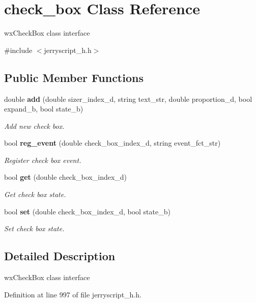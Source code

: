 \section{check\+\_\+box Class Reference}
\label{classcheck__box}


wx\+Check\+Box class interface  




{\ttfamily \#include $<$jerryscript\+\_\+h.\+h$>$}

\subsection*{Public Member Functions}
\begin{DoxyCompactItemize}
\item 
double \textbf{ add} (double sizer\+\_\+index\+\_\+d, string text\+\_\+str, double proportion\+\_\+d, bool expand\+\_\+b, bool state\+\_\+b)
\begin{DoxyCompactList}\small\item\em Add new check box. \end{DoxyCompactList}\item 
bool \textbf{ reg\+\_\+event} (double check\+\_\+box\+\_\+index\+\_\+d, string event\+\_\+fct\+\_\+str)
\begin{DoxyCompactList}\small\item\em Register check box event. \end{DoxyCompactList}\item 
bool \textbf{ get} (double check\+\_\+box\+\_\+index\+\_\+d)
\begin{DoxyCompactList}\small\item\em Get check box state. \end{DoxyCompactList}\item 
bool \textbf{ set} (double check\+\_\+box\+\_\+index\+\_\+d, bool state\+\_\+b)
\begin{DoxyCompactList}\small\item\em Set check box state. \end{DoxyCompactList}\end{DoxyCompactItemize}


\subsection{Detailed Description}
wx\+Check\+Box class interface 

Definition at line 997 of file jerryscript\+\_\+h.\+h.



